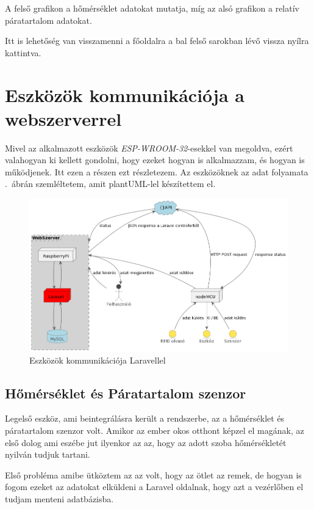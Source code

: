 \documentclass[
]{thesis-ekf}
\theoremstyle{definition}
\theoremstyle{remark}
\begin{document}
	A felső grafikon a hőmérséklet adatokat mutatja, míg az alsó grafikon a relatív páratartalom adatokat. 
	
	Itt is lehetőség van visszamenni a főoldalra a bal felső sarokban lévő vissza nyílra kattintva.
	\section{Eszközök kommunikációja a webszerverrel}\label{csatlakozas-a-webszerverre}
	Mivel az alkalmazott eszközök \emph{ESP-WROOM-32}-esekkel van megoldva, ezért valahogyan ki kellett gondolni, hogy ezeket hogyan is alkalmazzam, és hogyan is működjenek. Itt ezen a részen ezt részletezem. Az eszközöknek az adat folyamata .~ábrán szemléltetem, amit plantUML-lel készítettem el.
	
	\begin{figure}[ht!]
		\centering
		\includegraphics[width=1\textwidth]{./src/HU_sensor with webserver uml diagram}
		\caption{Eszközök kommunikációja Laravellel}
		\label{esp-laravel.communication}
	\end{figure}
	
	\subsection{Hőmérséklet és Páratartalom szenzor}
	Legelső eszköz, ami beintegrálásra került a rendszerbe, az a hőmérséklet és páratartalom szenzor volt. Amikor az ember okos otthont képzel el magának, az első dolog ami eszébe jut ilyenkor az az, hogy az adott szoba hőmérsékletét nyilván tudjuk tartani. 
	
	Első probléma amibe ütköztem az az volt, hogy az ötlet az remek, de hogyan is fogom ezeket az adatokat elküldeni a Laravel oldalnak, hogy azt a vezérlőben el tudjam menteni adatbázisba.
	
\end{document}
